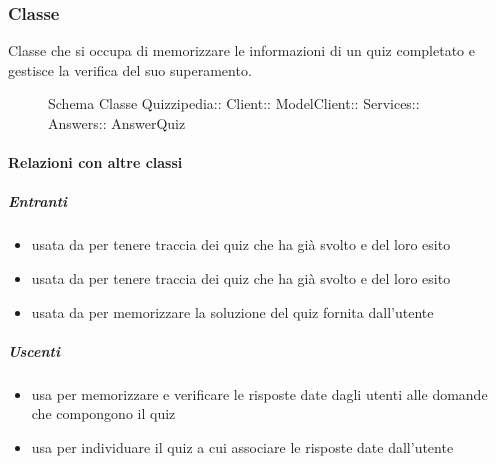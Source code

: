 \subsubsection{Classe }
Classe che si occupa di memorizzare le informazioni di un quiz completato e gestisce la verifica del suo superamento.
\begin{figure}[H]
\centering
\noindent{}
\caption[Schema Classe AnswerQuiz]{Schema Classe Quizzipedia:: Client:: ModelClient:: Services:: Answers:: AnswerQuiz}
\end{figure}
\paragraph{Relazioni con altre classi}
\subparagraph{Entranti}
\begin{itemize}
\item usata da  per tenere traccia dei quiz che ha già svolto e del loro esito
\item usata da  per tenere traccia dei quiz che ha già svolto e del loro esito
\item usata da  per memorizzare la soluzione del quiz fornita dall'utente
\end{itemize}
\subparagraph{Uscenti}
\begin{itemize}
\item usa  per memorizzare e verificare le risposte date dagli utenti alle domande che compongono il quiz
\item usa  per individuare il quiz a cui associare le risposte date dall'utente
\end{itemize}
